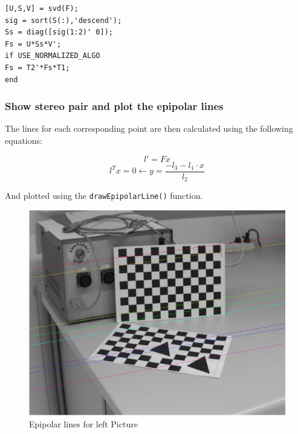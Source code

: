 \documentclass[
a4paper,     %
11pt         %
]{scrartcl}  %
\begin{document}
\begin{lstlisting}[label=lst:constraint, caption=Matlab script for imposing rank 2 constraint]
[U,S,V] = svd(F);
sig = sort(S(:),'descend');
Ss = diag([sig(1:2)' 0]);
Fs = U*Ss*V';
if USE_NORMALIZED_ALGO
Fs = T2'*Fs*T1;
end
\end{lstlisting}

\subsubsection{Show stereo pair and plot the epipolar lines}

The lines for each corresponding point are then calculated using the following equations:

$$ l' = F x $$
$$ l^T x = 0 \leftarrow y = \frac{-l_3 - l_1 \cdot x}{l_2} $$

And plotted using the \lstinline{drawEpipolarLine()} function.

\begin{figure}
 \centering
 \includegraphics[scale=0.4]{left_lines.jpg}
 \caption{Epipolar lines for left Picture}
 \label{fig:left_lines}
\end{figure}
\end{document}
